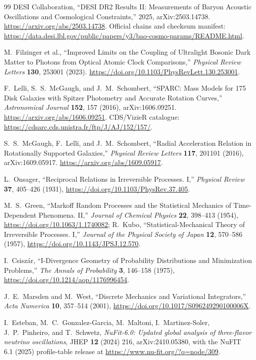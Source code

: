 \begin{thebibliography}{99}
DESI Collaboration,
``DESI DR2 Results II: Measurements of Baryon Acoustic Oscillations and
Cosmological Constraints,'' 2025, arXiv:2503.14738.
\url{https://arxiv.org/abs/2503.14738}. Official chains and checksum manifest:
\url{https://data.desi.lbl.gov/public/papers/y3/bao-cosmo-params/README.html}.

M.~Filzinger et al.,
``Improved Limits on the Coupling of Ultralight Bosonic Dark Matter to
Photons from Optical Atomic Clock Comparisons,''
\emph{Physical Review Letters} \textbf{130}, 253001 (2023).
\url{https://doi.org/10.1103/PhysRevLett.130.253001}.

F.~Lelli, S.~S.~McGaugh, and J.~M.~Schombert,
``SPARC: Mass Models for 175 Disk Galaxies with Spitzer Photometry and
Accurate Rotation Curves,'' \emph{Astronomical Journal} \textbf{152}, 157
(2016), arXiv:1606.09251.
\url{https://arxiv.org/abs/1606.09251}. CDS/VizieR catalogue:
\url{https://cdsarc.cds.unistra.fr/ftp/J/AJ/152/157/}.

S.~S.~McGaugh, F.~Lelli, and J.~M.~Schombert,
``Radial Acceleration Relation in Rotationally Supported Galaxies,''
\emph{Physical Review Letters} \textbf{117}, 201101 (2016),
arXiv:1609.05917.
\url{https://arxiv.org/abs/1609.05917}.

L.~Onsager,
``Reciprocal Relations in Irreversible Processes. I,''
\emph{Physical Review} \textbf{37}, 405--426 (1931),
\url{https://doi.org/10.1103/PhysRev.37.405}.

M.~S.~Green, ``Markoff Random Processes and the Statistical Mechanics of
Time-Dependent Phenomena. II,'' \emph{Journal of Chemical Physics}
\textbf{22}, 398--413 (1954), \url{https://doi.org/10.1063/1.1740082};
R.~Kubo, ``Statistical-Mechanical Theory of Irreversible Processes. I,''
\emph{Journal of the Physical Society of Japan} \textbf{12}, 570--586
(1957), \url{https://doi.org/10.1143/JPSJ.12.570}.

I.~Csisz\'ar,
``I-Divergence Geometry of Probability Distributions and Minimization Problems,''
\emph{The Annals of Probability} \textbf{3}, 146--158 (1975),
\url{https://doi.org/10.1214/aop/1176996454}.

J.~E.~Marsden and M.~West,
``Discrete Mechanics and Variational Integrators,''
\emph{Acta Numerica} \textbf{10}, 357--514 (2001),
\url{https://doi.org/10.1017/S096249290100006X}.

I.~Esteban, M.~C.~Gonzalez-Garcia, M.~Maltoni, I.~Martinez-Soler, J.~P.~Pinheiro, and T.~Schwetz,
\emph{NuFit-6.0: Updated global analysis of three-flavor neutrino oscillations},
JHEP \textbf{12} (2024) 216, arXiv:2410.05380,
with the NuFIT 6.1 (2025) profile-table release at
\url{https://www.nu-fit.org/?q=node/309}.


\end{thebibliography}

